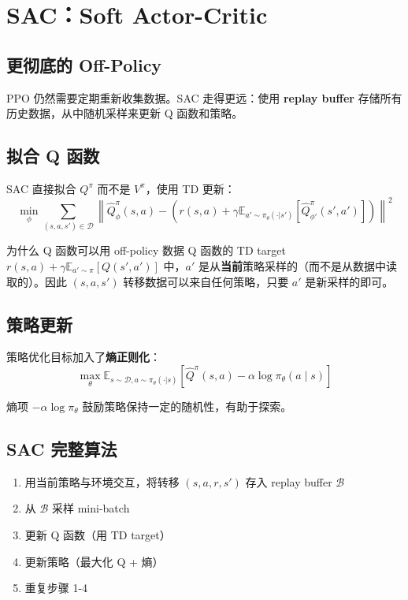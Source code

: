 \section{SAC：Soft Actor-Critic}

\subsection{更彻底的 Off-Policy}

PPO 仍然需要定期重新收集数据。SAC 走得更远：使用 \textbf{replay buffer} 存储所有历史数据，从中随机采样来更新 Q 函数和策略。

\subsection{拟合 Q 函数}

SAC 直接拟合 $Q^\pi$ 而不是 $V^\pi$，使用 TD 更新：
$$\min_\phi \sum_{(s,a,s') \in \mathcal{D}} \left\| \hat{Q}^\pi_\phi(s, a) - \left(r(s,a) + \gamma \mathbb{E}_{a' \sim \pi_\theta(\cdot|s')}\left[\hat{Q}^\pi_{\phi'}(s', a')\right]\right)\right\|^2$$

\begin{knowledgebox}{为什么 Q 函数可以用 off-policy 数据}
Q 函数的 TD target $r(s,a) + \gamma \mathbb{E}_{a' \sim \pi}\left[Q(s', a')\right]$ 中，$a'$ 是从\textbf{当前}策略采样的（而不是从数据中读取的）。因此 $(s, a, s')$ 转移数据可以来自任何策略，只要 $a'$ 是新采样的即可。
\end{knowledgebox}

\subsection{策略更新}

策略优化目标加入了\textbf{熵正则化}：
$$\max_\theta \mathbb{E}_{s \sim \mathcal{D}, a \sim \pi_\theta(\cdot|s)} \left[\hat{Q}^\pi(s, a) - \alpha \log \pi_\theta(a \mid s)\right]$$

熵项 $-\alpha \log \pi_\theta$ 鼓励策略保持一定的随机性，有助于探索。

\subsection{SAC 完整算法}

\begin{enumerate}
    \item 用当前策略与环境交互，将转移 $(s, a, r, s')$ 存入 replay buffer $\mathcal{B}$
    \item 从 $\mathcal{B}$ 采样 mini-batch
    \item 更新 Q 函数（用 TD target）
    \item 更新策略（最大化 Q + 熵）
    \item 重复步骤 1-4
\end{enumerate}

